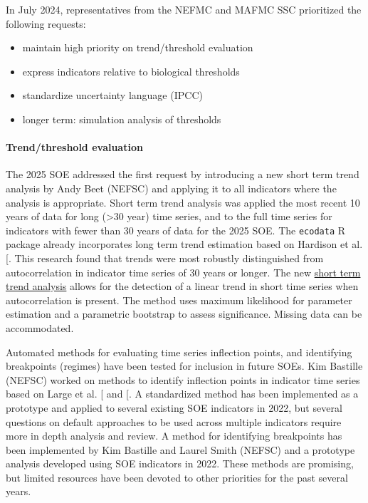 \documentclass[
  10pt,
]{article}
\providecommand{\tightlist}{%
  \setlength{\itemsep}{0pt}\setlength{\parskip}{0pt}}
\begin{document}
In July 2024, representatives from the NEFMC and MAFMC SSC prioritized
the following requests:

\begin{itemize}
\tightlist
\item
  maintain high priority on trend/threshold evaluation
\item
  express indicators relative to biological thresholds
\item
  standardize uncertainty language (IPCC)
\item
  longer term: simulation analysis of thresholds
\end{itemize}

\paragraph{Trend/threshold evaluation}\label{trendthreshold-evaluation}

The 2025 SOE addressed the first request by introducing a new short term
trend analysis by Andy Beet (NEFSC) and applying it to all indicators
where the analysis is appropriate. Short term trend analysis was applied
the most recent 10 years of data for long (\textgreater30 year) time
series, and to the full time series for indicators with fewer than 30
years of data for the 2025 SOE. The \texttt{ecodata} R package already
incorporates long term trend estimation based on Hardison et al.
{[}\citeproc{ref-hardison_simulation_2019}{2}{]}. This research found
that trends were most robustly distinguished from autocorrelation in
indicator time series of 30 years or longer. The new
\href{https://noaa-edab.github.io/tech-doc/short-term-trend-analysis.html}{short
term trend analysis} allows for the detection of a linear trend in short
time series when autocorrelation is present. The method uses maximum
likelihood for parameter estimation and a parametric bootstrap to assess
significance. Missing data can be accommodated.

Automated methods for evaluating time series inflection points, and
identifying breakpoints (regimes) have been tested for inclusion in
future SOEs. Kim Bastille (NEFSC) worked on methods to identify
inflection points in indicator time series based on Large et al.
{[}\citeproc{ref-large_defining_2013}{3}{]} and
{[}\citeproc{ref-large_quantifying_2015}{4}{]}. A standardized method
has been implemented as a prototype and applied to several existing SOE
indicators in 2022, but several questions on default approaches to be
used across multiple indicators require more in depth analysis and
review. A method for identifying breakpoints has been implemented by Kim
Bastille and Laurel Smith (NEFSC) and a prototype analysis developed
using SOE indicators in 2022. These methods are promising, but limited
resources have been devoted to other priorities for the past several
years.
\end{document}

